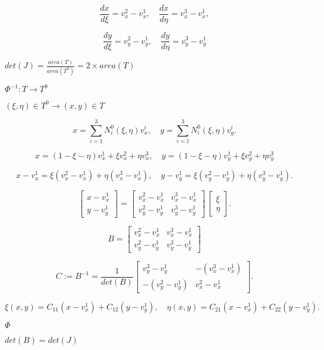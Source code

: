 \documentclass{article}
\begin{document}
\[ \frac{dx}{d\xi} = v^2_x - v^1_x, \quad \frac{dx}{d\eta} = v^3_x -
v^1_x, \]
\pagebreak

\[ \frac{dy}{d\xi} = v^2_y - v^1_y, \quad \frac{dy}{d\eta} = v^3_y -
v^1_y \]
\pagebreak

$ det(J) = \frac{area(T)}{area(T^0)} = 2\times area(T) $
\pagebreak

$ \Phi^{-1} : T \to T^9 $
\pagebreak

$ (\xi, \eta )\in T^0 \to (x,y) \in T $
\pagebreak

\[ x = \sum_{i=1}^3 N^0_i(\xi, \eta) v^i_x, \quad y = \sum_{i=1}^3
N^0_i(\xi, \eta)  v^i_y. \]
\pagebreak

\[ x = (1 - \xi - \eta) v^1_x + \xi v^2_x + \eta v^3_x, \quad y = (1
- \xi - \eta) v^1_y + \xi v^2_y + \eta v^3_y \]
\pagebreak

\[ x - v^1_x = \xi
(v^2_x - v^1_x) + \eta (v^3_x - v^1_x), \quad y - v^1_y = \xi (v^2_y - v^1_y)
+ \eta (v^3_y - v^1_y). \]
\pagebreak

\[ \left[ {\begin{array}{c} x - v^1_x \\
y - v^1_y \end{array}}\right] = \left[ {\begin{array}{cc} v^2_x - v^1_x &
v^3_x - v^1_x \\
v^2_y - v^1_y & v^3_y - v^1_y \end{array}}\right] \, \left[
{\begin{array}{c} \xi \\
\eta \end{array}}\right]. \]
\pagebreak

\[ B = \left[ {\begin{array}{cc} v^2_x - v^1_x & v^3_x - v^1_x \\
v^2_y - v^1_y & v^3_y - v^1_y \end{array}}\right] \]
\pagebreak

\[ C := B^{-1} = \frac{1}{det(B)} \left[ {\begin{array}{cc} v^3_y - v^1_y
& -(v^3_x -
v^1_x) \\ -(v^2_y - v^1_y) & v^2_x - v^1_x \end{array}}\right]. \]
\pagebreak

\[ \xi(x,y) = C_{11} (x - v^1_x) + C_{12} (y - v^1_y), \quad \eta(x,y) =
C_{21} (x - v^1_x) + C_{22} (y - v^1_y). \]
\pagebreak

$
\Phi$
\pagebreak

$ det(B) = det(J) $
\pagebreak
\end{document}
